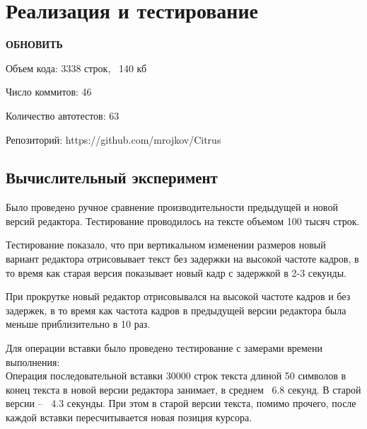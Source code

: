 \documentclass{fefu}
\begin{document}
	\section{Реализация и тестирование}
		\par \textbf{ОБНОВИТЬ}
		\par Объем кода: 3338 строк, ~140 кб
		\par Число коммитов: 46
		\par Количество автотестов: 63
		\par Репозиторий: https://github.com/mrojkov/Citrus
		\subsection{Вычислительный эксперимент}
			\par Было проведено ручное сравнение производительности предыдущей и новой версий 
			редактора. Тестирование проводилось на тексте объемом 100 тысяч строк.
			\par Тестирование показало, что при вертикальном изменении размеров новый вариант 
			редактора отрисовывает текст без задержки на высокой частоте кадров, в то время как
			старая версия показывает новый кадр с задержкой в 2-3 секунды.
			\par При прокрутке новый редактор отрисовывался на высокой частоте кадров и без 
			задержек, в то время как частота кадров в предыдущей версии редактора была меньше
			приблизительно в 10 раз.
			\par Для операции вставки было проведено тестирование с замерами времени 
			выполнения:\\
			Операция последовательной вставки 30000 строк текста длиной 50 символов в конец
			текста в новой версии редактора занимает, в среднем ~6.8 секунд. В старой 
			версии -- ~4.3 секунды. При этом в старой версии текста, помимо прочего, после 
			каждой вставки пересчитывается новая позиция курсора.
\end{document}
